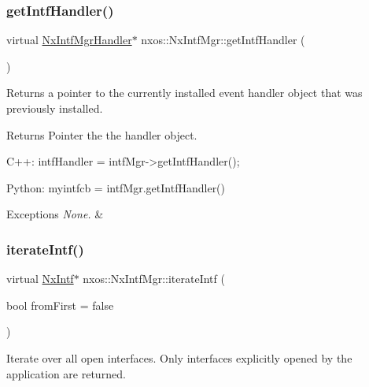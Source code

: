 \subsubsection{\texorpdfstring{get\+Intf\+Handler()}{getIntfHandler()}}
{\footnotesize\ttfamily virtual \mbox{\hyperlink{classnxos_1_1_nx_intf_mgr_handler}{Nx\+Intf\+Mgr\+Handler}}$\ast$ nxos\+::\+Nx\+Intf\+Mgr\+::get\+Intf\+Handler (\begin{DoxyParamCaption}{ }\end{DoxyParamCaption})\hspace{0.3cm}{\ttfamily [pure virtual]}}

Returns a pointer to the currently installed event handler object that was previously installed. ~\newline
 \begin{DoxyReturn}{Returns}
Pointer the the handler object.
\end{DoxyReturn}

\begin{DoxyCode}
C++:
     intfHandler = intfMgr->getIntfHandler();

Python:
     myintfcb = intfMgr.getIntfHandler()
\end{DoxyCode}



\begin{DoxyExceptions}{Exceptions}
{\em None.} & \\
\hline
\end{DoxyExceptions}
\mbox{\label{classnxos_1_1_nx_intf_mgr_acbe3d94cba5b7982d80cc498d7fcbdf7}} 
\subsubsection{\texorpdfstring{iterate\+Intf()}{iterateIntf()}}
{\footnotesize\ttfamily virtual \mbox{\hyperlink{classnxos_1_1_nx_intf}{Nx\+Intf}}$\ast$ nxos\+::\+Nx\+Intf\+Mgr\+::iterate\+Intf (\begin{DoxyParamCaption}\item[{bool}]{from\+First = {\ttfamily false} }\end{DoxyParamCaption})\hspace{0.3cm}{\ttfamily [pure virtual]}}

Iterate over all open interfaces. Only interfaces explicitly opened by the application are returned. ~\newline

